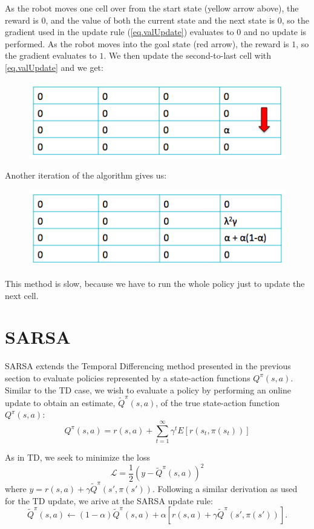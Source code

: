 \documentclass[11pt]{article}
\numberwithin{equation}{section}
\numberwithin{figure}{section}
\begin{document}
As the robot moves one cell over from the start state (yellow arrow above), the reward is $0$, and the value of both the current state and the next state is $0$, so the gradient used in the update rule (\cref{eq.valUpdate}) evaluates to $0$ and no update is performed. As the robot moves into the goal state (red arrow), the reward is $1$, so the gradient evaluates to $1$.  We then update the second-to-last cell with \cref{eq.valUpdate} and we get:

\begin{figure}[h!]
	\centering
	\includegraphics[width=.4\columnwidth]{./images/fig3}
	\label{fig.fig3}
\end{figure}

Another iteration of the algorithm gives us:

\begin{figure}[h!]
	\centering
	\includegraphics[width=.4\columnwidth]{./images/fig4}
	\label{fig.fig4}
\end{figure}

This method is slow, because we have to run the whole policy just to update the next cell.  

\section{SARSA}
SARSA extends the Temporal Differencing method presented in the previous
section to evaluate policies represented by a state-action functions
$Q^\pi(s,a)$. Similar to the TD case, we wish to evaluate a policy by
performing an online update to obtain an estimate, $\tilde{Q}^\pi(s,a)$, of the
true state-action function $Q^\pi(s,a)$:
\begin{equation}
	Q^\pi(s,a) = r(s,a) + \sum_{t = 1}^\infty \gamma^t E[r(s_t,\pi(s_t))]
	\label{eq.sarsaEval}
\end{equation}

As in TD, we seek to minimize the loss
\begin{equation}
	\mathcal{L} = \frac{1}{2} \left(y - \tilde{Q}^\pi(s,a) \right)^2
	\label{eq.sarsaLoss}
\end{equation}
where $y = r(s,a) + \gamma \tilde{Q}^\pi(s',\pi(s'))$. Following a similar
derivation as used for the TD update, we arive at the SARSA update rule:
\begin{equation}
    \tilde{Q}^\pi(s,a) \leftarrow  (1 - \alpha) \tilde{Q}^\pi(s,a)
        + \alpha \left[ r(s,a) + \gamma \tilde{Q}^\pi(s',\pi(s')) \right].
	\label{eq.sarsaUpdate}
\end{equation}
\end{document}
